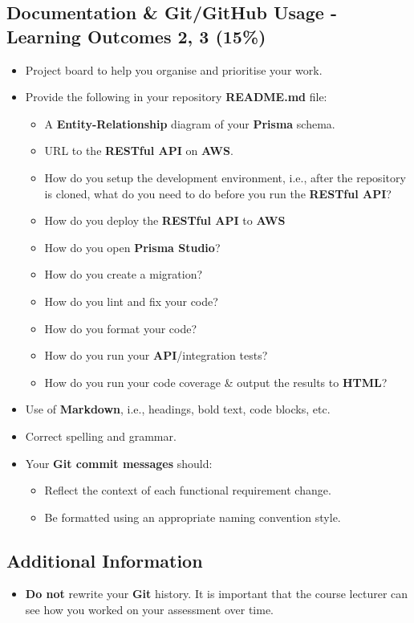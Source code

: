 \documentclass{article}
\begin{document}
\subsection*{Documentation \& Git/GitHub Usage - Learning Outcomes 2, 3 (15\%)}
\begin{itemize}
	\item Project board to help you organise and prioritise your work. 
	\item Provide the following in your repository \textbf{README.md} file:
	\begin{itemize}
		\item A \textbf{Entity-Relationship} diagram of your \textbf{Prisma} schema.
		\item URL to the \textbf{RESTful API} on \textbf{AWS}.
		\item How do you setup the development environment, i.e., after the repository is cloned, what do you need to do before you run the \textbf{RESTful API}?
		\item How do you deploy the \textbf{RESTful API} to \textbf{AWS}
		\item How do you open \textbf{Prisma Studio}?
		\item How do you create a migration?
		\item How do you lint and fix your code?
		\item How do you format your code?
		\item How do you run your \textbf{API}/integration tests?
		\item How do you run your code coverage \& output the results to \textbf{HTML}?
	\end{itemize}
	\item Use of \textbf{Markdown}, i.e., headings, bold text, code blocks, etc.
	\item Correct spelling and grammar. 
	\item Your \textbf{Git commit messages} should:
	\begin{itemize}
		\item Reflect the context of each functional requirement change.
		\item Be formatted using an appropriate naming convention style.
	\end{itemize}	
\end{itemize}

\subsection*{Additional Information}
\begin{itemize}
	\item \textbf{Do not} rewrite your \textbf{Git} history. It is important that the course lecturer can see how you worked on your assessment over time.
\end{itemize}
\end{document}
